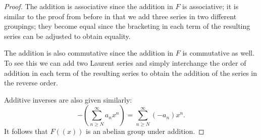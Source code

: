 \documentclass[11pt]{article}
\newcommand{\br}[1]{\left(#1\right)}
\begin{document}
\begin{enumerate}
\begin{enumerate}
\begin{proof}
            The addition is associative since the addition in $F$ is associative; it is similar to the proof from before in that we add three series in two different groupings; they become equal since the bracketing in each term of the resulting series can be adjusted to obtain equality.
            
            The addition is also commutative since the addition in $F$ is commutative as well. To see this we can add two Laurent series and simply interchange the order of addition in each term of the resulting series to obtain the addition of the series in the reverse order. 
            
            Additive inverses are also given similarly: \[-\br{\sum_{n\geq N}^{\infty} a_nx^n} = \sum_{n\geq N}^{\infty} (-a_n)x^n.\]
            It follows that $F((x))$ is an abelian group under addition.


\end{proof}
\end{enumerate}
\end{enumerate}
\end{document}
